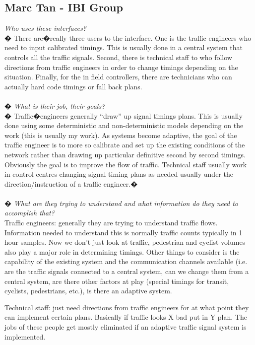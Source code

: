 \documentclass{report}
\begin{document}
\subsection{Marc Tan - IBI Group}
\emph{Who uses these interfaces?} \\
�
There are�really three users to the interface.
One is the traffic engineers who need to input calibrated timings.
This is usually done in a central system that controls all the traffic signals.
Second, there is technical staff to who follow directions from traffic engineers in order to change timings depending on the situation.
Finally, for the in field controllers, there are technicians who can actually hard code timings or fall back plans. \\ \\
�
\emph{What is their job, their goals?} \\
�
Traffic�engineers generally ``draw'' up signal timings plans.
This is usually done using some deterministic and non-deterministic models depending on the work (this is usually my work).
As systems become adaptive, the goal of the traffic engineer is to more so calibrate and set up the existing conditions of the network rather than drawing up particular definitive second by second timings.
Obviously the goal is to improve the flow of traffic.
Technical staff usually work in control centres changing signal timing plans as needed usually under the direction/instruction of a traffic engineer.�\\ \\
�
\emph{What are they trying to understand and what information do they need to accomplish that?} \\ 
Traffic engineers: generally they are trying to understand traffic flows.
Information needed to understand this is normally traffic counts typically in 1 hour samples.
Now we don't just look at traffic, pedestrian and cyclist volumes also play a major role in determining timings.
Other things to consider is the capability of the existing system and the communication channels available (i.e. are the traffic signals connected to a central system, can we change them from a central system, are there other factors at play (special timings for transit, cyclists, pedestrians, etc.), is there an adaptive system.

Technical staff: just need directions from traffic engineers for at what point they can implement certain plans.
Basically if traffic looks X bad put in Y plan.
The jobs of these people get mostly eliminated if an adaptive traffic signal system is implemented. \\ 
\end{document}
